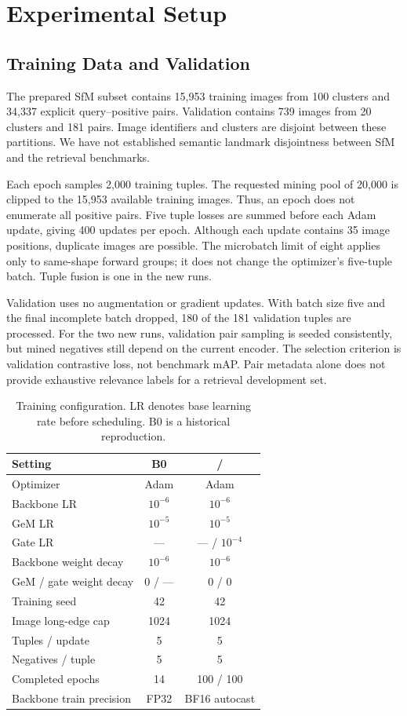 \section{Experimental Setup}
\subsection{Training Data and Validation}
The prepared SfM subset contains 15,953 training images from 100 clusters and 34,337 explicit query--positive pairs. Validation contains 739 images from 20 clusters and 181 pairs. Image identifiers and clusters are disjoint between these partitions. We have not established semantic landmark disjointness between SfM and the retrieval benchmarks.

Each epoch samples 2,000 training tuples. The requested mining pool of 20,000 is clipped to the 15,953 available training images. Thus, an epoch does not enumerate all positive pairs. Five tuple losses are summed before each Adam update, giving 400 updates per epoch. Although each update contains 35 image positions, duplicate images are possible. The microbatch limit of eight applies only to same-shape forward groups; it does not change the optimizer's five-tuple batch. Tuple fusion is one in the new runs.

Validation uses no augmentation or gradient updates. With batch size five and the final incomplete batch dropped, 180 of the 181 validation tuples are processed. For the two new runs, validation pair sampling is seeded consistently, but mined negatives still depend on the current encoder. The selection criterion is validation contrastive loss, not benchmark mAP. Pair metadata alone does not provide exhaustive relevance labels for a retrieval development set.

\begin{table}[t]
\caption{Training configuration. LR denotes base learning rate before scheduling. B0 is a historical reproduction.}
\label{tab:train}
\centering\footnotesize
\begin{tabular}{lcc}
\toprule
Setting & B0 & \Rone{} / \Rtwo{} \\
\midrule
Optimizer & Adam & Adam \\
Backbone LR & $10^{-6}$ & $10^{-6}$ \\
GeM LR & $10^{-5}$ & $10^{-5}$ \\
Gate LR & --- & --- / $10^{-4}$ \\
Backbone weight decay & $10^{-6}$ & $10^{-6}$ \\
GeM / gate weight decay & 0 / --- & 0 / 0 \\
Training seed & 42 & 42 \\
Image long-edge cap & 1024 & 1024 \\
Tuples / update & 5 & 5 \\
Negatives / tuple & 5 & 5 \\
Completed epochs & 14 & 100 / 100 \\
Backbone train precision & FP32 & BF16 autocast \\
\bottomrule
\end{tabular}
\end{table}


